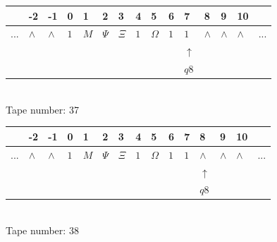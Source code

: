 \documentclass[11pt]{article}
\begin{document}
\begin{table}[H]
\centering
\begin{tabular}{lllllllllllllll}
 & -2 & -1 & 0 & 1 & 2 & 3 & 4 & 5 & 6 & 7 & 8 & 9 & 10 & \\
\hline
$...$ & \multicolumn{1}{|l|}{$\wedge$} & \multicolumn{1}{|l|}{$\wedge$} & \multicolumn{1}{|l|}{$1$} & \multicolumn{1}{|l|}{$M$} & \multicolumn{1}{|l|}{$\Psi$} & \multicolumn{1}{|l|}{$\Xi$} & \multicolumn{1}{|l|}{$1$} & \multicolumn{1}{|l|}{$\Omega$} & \multicolumn{1}{|l|}{$1$} & \multicolumn{1}{|l|}{$1$} & \multicolumn{1}{|l|}{$\wedge$} & \multicolumn{1}{|l|}{$\wedge$} & \multicolumn{1}{|l|}{$\wedge$} & $...$\\
\hline
&  &  &  &  &  &  &  &  &  & $\uparrow$ &  &  &  &  \\
&  &  &  &  &  &  &  &  &  & $ q8 $ &  &  &  &  \\
\end{tabular}
\\
Tape number: 37
\noindent\makebox[\linewidth]{\hdashrule{\textwidth}{1pt}{1pt}}\end{table}

\begin{table}[H]
\centering
\begin{tabular}{lllllllllllllll}
 & -2 & -1 & 0 & 1 & 2 & 3 & 4 & 5 & 6 & 7 & 8 & 9 & 10 & \\
\hline
$...$ & \multicolumn{1}{|l|}{$\wedge$} & \multicolumn{1}{|l|}{$\wedge$} & \multicolumn{1}{|l|}{$1$} & \multicolumn{1}{|l|}{$M$} & \multicolumn{1}{|l|}{$\Psi$} & \multicolumn{1}{|l|}{$\Xi$} & \multicolumn{1}{|l|}{$1$} & \multicolumn{1}{|l|}{$\Omega$} & \multicolumn{1}{|l|}{$1$} & \multicolumn{1}{|l|}{$1$} & \multicolumn{1}{|l|}{$\wedge$} & \multicolumn{1}{|l|}{$\wedge$} & \multicolumn{1}{|l|}{$\wedge$} & $...$\\
\hline
&  &  &  &  &  &  &  &  &  &  & $\uparrow$ &  &  &  \\
&  &  &  &  &  &  &  &  &  &  & $ q8 $ &  &  &  \\
\end{tabular}
\\
Tape number: 38
\noindent\makebox[\linewidth]{\hdashrule{\textwidth}{1pt}{1pt}}\end{table}
\end{document}

